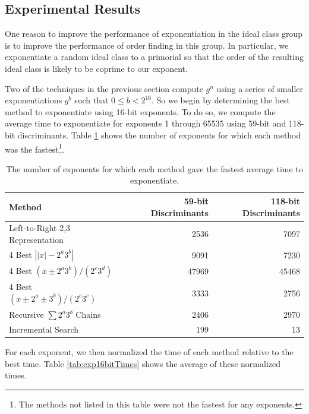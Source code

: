 \documentclass{ucalgthes1}
\theoremstyle{definition}
\begin{document}
\subsection{Experimental Results}

One reason to improve the performance of exponentiation in the ideal class group is to improve the performance of order finding in this group.  In particular, we exponentiate a random ideal class to a primorial so that the order of the resulting ideal class is likely to be coprime to our exponent.

Two of the techniques in the previous section compute $g^n$ using a series of smaller exponentiations $g^b$ such that $0 \le b < 2^{16}$.  So we begin by determining the best method to exponentiate using 16-bit exponents.  To do so, we compute the average time to exponentiate for exponents 1 through 65535 using 59-bit and 118-bit discriminants.  Table \ref{tab:exp16bitWinners} shows the number of exponents for which each method was the fastest\footnote{The methods not listed in this table were not the fastest for any exponents.}.
\begin{table}[h]
\centering
\begin{tabular}{| l | r | r |}
	\hline
	Method & 59-bit Discriminants & 118-bit Discriminants \\
	\hline
	Left-to-Right 2,3 Representation & 2536 & 7097 \\
	4 Best $\left||x|-2^a3^b\right|$ & 9091 & 7230 \\
	4 Best $(x \pm 2^a3^b)/(2^c3^d)$ & 47969 & 45468 \\
	4 Best $(x \pm 2^a \pm 3^b)/(2^c3^c)$ & 3333 & 2756 \\
	Recursive $\sum 2^a3^b$ Chains & 2406 & 2970 \\
	Incremental Search & 199 & 13 \\
	\hline
\end{tabular}
\caption{The number of exponents for which each method gave the fastest average time to exponentiate.}
\label{tab:exp16bitWinners}
\end{table}
For each exponent, we then normalized the time of each method relative to the best time.  Table \ref{tab:exp16bitTimes} shows the average of these normalized times.
\end{document}
